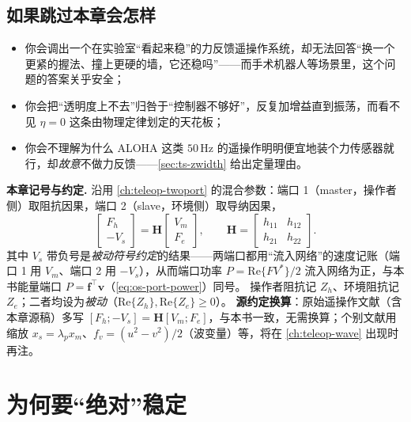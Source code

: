\subsection*{如果跳过本章会怎样}
\begin{itemize}
  \item 你会调出一个在实验室“看起来稳”的力反馈遥操作系统，却无法回答“换一个更紧的握法、撞上更硬的墙，它还稳吗”——而手术机器人等场景里，这个问题的答案关乎安全；
  \item 你会把“透明度上不去”归咎于“控制器不够好”，反复加增益直到振荡，而看不见 $\eta=0$ 这条由物理定律划定的天花板；
  \item 你会不理解为什么 ALOHA 这类 $50\,$Hz 的遥操作明明便宜地装个力传感器就行，却\emph{故意}不做力反馈——\cref{sec:ts-zwidth} 给出定量理由。
\end{itemize}

\begin{note}
\textbf{本章记号与约定.}\;
沿用 \cref{ch:teleop-twoport} 的混合参数：端口 1（master，操作者侧）取阻抗因果，端口 2（slave，环境侧）取导纳因果，
\begin{equation}
  \begin{bmatrix}F_h\\-V_s\end{bmatrix}=\mathbf H\begin{bmatrix}V_m\\F_e\end{bmatrix},\qquad
  \mathbf H=\begin{bmatrix}h_{11}&h_{12}\\h_{21}&h_{22}\end{bmatrix}.
  \label{eq:ts-hparam}
\end{equation}
其中 $V_s$ 带负号是\emph{被动符号约定}的结果——两端口都用“流入网络”的速度记账（端口 1 用 $V_m$、端口 2 用 $-V_s$），从而端口功率 $P=\mathrm{Re}\{F V^*\}/2$ 流入网络为正，与本书能量端口 $P=\mathbf f^\top\mathbf v$（\cref{eq:os-port-power}）同号。
操作者阻抗记 $Z_h$、环境阻抗记 $Z_e$；二者均设为\emph{被动}（$\mathrm{Re}\{Z_h\},\mathrm{Re}\{Z_e\}\ge0$）。
\textbf{源约定换算}：原始遥操作文献（含本章源稿）多写 $[F_h;-V_s]=\mathbf H[V_m;F_e]$，与本书一致，无需换算；个别文献用缩放 $x_s=\lambda_p x_m$、$f_v=(u^2-v^2)/2$（波变量）等，将在 \cref{ch:teleop-wave} 出现时再注。
\end{note}

\section{为何要“绝对”稳定}
\label{sec:ts-why}

